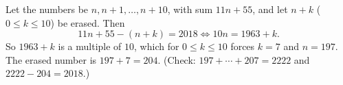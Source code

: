 Let the numbers be $n,n+1,\dots,n+10$, with sum $11n+55$, and let $n+k$ ($0\le k\le10$) be erased. Then
\[11n+55-(n+k)=2018\iff10n=1963+k.\]
So $1963+k$ is a multiple of $10$, which for $0\le k\le10$ forces $k=7$ and $n=197$. The erased number is $197+7=\boxed{204}$. (Check: $197+\cdots+207=2222$ and $2222-204=2018$.)
